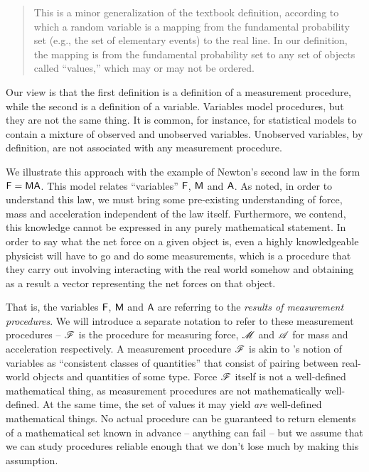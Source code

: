 \begin{quote}
This is a minor generalization of the textbook definition, according to which a random variable is a mapping from the fundamental probability set (e.g., the set of elementary events) to the real line. In our definition, the mapping is from the fundamental probability set to any set of objects called ``values,'' which may or may not be ordered.
\end{quote}

Our view is that the first definition is a definition of a measurement procedure, while the second is a definition of a variable. Variables model procedures, but they are not the same thing. It is common, for instance, for statistical models to contain a mixture of observed and unobserved variables. Unobserved variables, by definition, are not associated with any measurement procedure.


We illustrate this approach with the example of Newton's second law in the form $\mathsf{F}=\mathsf{MA}$. This model relates ``variables'' $\mathsf{F}$, $\mathsf{M}$ and $\mathsf{A}$. As \citet{feynman_feynman_1979} noted, in order to understand this law, we must bring some pre-existing understanding of force, mass and acceleration independent of the law itself. Furthermore, we contend, this knowledge cannot be expressed in any purely mathematical statement. In order to say what the net force on a given object is, even a highly knowledgeable physicist will have to go and do some measurements, which is a procedure that they carry out involving interacting with the real world somehow and obtaining as a result a vector representing the net forces on that object.

That is, the variables $\mathsf{F}$, $\mathsf{M}$ and $\mathsf{A}$ are referring to the \emph{results of measurement procedures}. We will introduce a separate notation to refer to these measurement procedures -- $\mathscr{F}$ is the procedure for measuring force, $\mathscr{M}$ and $\mathscr{A}$ for mass and acceleration respectively. A measurement procedure $\mathscr{F}$ is akin to \citet{menger_random_2003}'s notion of variables as ``consistent classes of quantities'' that consist of pairing between real-world objects and quantities of some type. Force $\mathscr{F}$ itself is not a well-defined mathematical thing, as measurement procedures are not mathematically well-defined. At the same time, the set of values it may yield \emph{are} well-defined mathematical things. No actual procedure can be guaranteed to return elements of a mathematical set known in advance -- anything can fail -- but we assume that we can study procedures reliable enough that we don't lose much by making this assumption.


